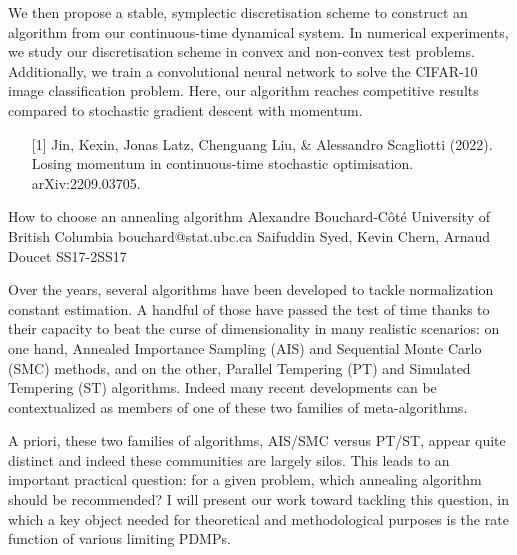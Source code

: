 \begin{talk}
We then propose a stable, symplectic discretisation scheme to construct an algorithm from our continuous-time dynamical system. In numerical experiments, we study our discretisation scheme in convex and non-convex test problems. Additionally, we train a convolutional neural network to solve the CIFAR-10 image classification problem. Here, our algorithm reaches competitive results compared to stochastic gradient descent with momentum.

\medskip

\begin{enumerate}
	\item[{[1]}] Jin, Kexin, Jonas Latz, Chenguang Liu, \& Alessandro Scagliotti (2022). Losing momentum in continuous-time stochastic optimisation. arXiv:2209.03705.
\end{enumerate}

\end{talk}

\begin{talk}
  {How to choose an annealing algorithm}%
  {Alexandre Bouchard-C\^ot\'e}%
  {University of British Columbia}%
  {bouchard@stat.ubc.ca}%
  {Saifuddin Syed, Kevin Chern, Arnaud Doucet}%
{}{}{SS17-2}{SS17}


				
				

Over the years, several algorithms have been developed to tackle normalization constant estimation. A handful of those have passed the test of time thanks to their capacity to beat the curse of dimensionality in many realistic scenarios: on one hand, Annealed Importance Sampling (AIS) and Sequential Monte Carlo (SMC) methods, and on the other, Parallel Tempering (PT) and Simulated Tempering (ST) algorithms. Indeed many recent developments can be contextualized as members of one of these two families of meta-algorithms.

A priori, these two families of algorithms, AIS/SMC versus PT/ST, appear quite distinct and indeed these communities are largely silos. This leads to an important practical question: for a given problem, which annealing algorithm should be recommended? I will present our work toward tackling this question, in which a key object needed for theoretical and methodological purposes is the rate function of various limiting PDMPs. 
\end{talk}

